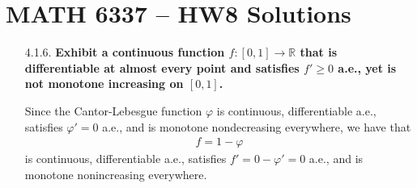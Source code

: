 \documentclass[a4paper,12pt]{article}
\begin{document}
\section*{MATH 6337 -- HW8 Solutions}
\begin{enumerate}
    \item[4.1.6.]
        \boldmath\textbf{Exhibit a continuous function $f : [0, 1] \to \mathbb{R}$ that is differentiable at almost every point and satisfies $f' \geq 0$ a.e., yet is not monotone increasing on $[0, 1]$.
        }\unboldmath \par
        Since the Cantor-Lebesgue function $\varphi$ is continuous, differentiable a.e., satisfies $\varphi' = 0$ a.e., and is monotone nondecreasing everywhere, we have that
        \begin{align*}
            f = 1 - \varphi
        \end{align*}
        is continuous, differentiable a.e., satisfies $f' = 0 - \varphi' = 0$ a.e., and is monotone nonincreasing everywhere.


\end{enumerate}
\end{document}
